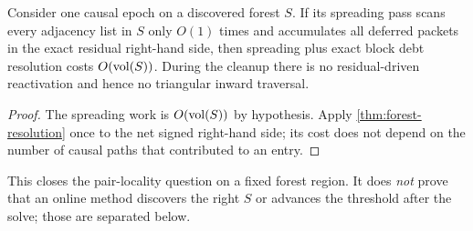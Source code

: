 \begin{corollary}
\label{cor:forest-pair-locality}
Consider one causal epoch on a discovered forest $S$.  If its spreading pass
scans every adjacency list in $S$ only $O(1)$ times and accumulates all
deferred packets in the exact residual right-hand side, then spreading plus
exact block debt resolution costs $O(\operatorname{vol}(S))$.  During the cleanup there is
no residual-driven reactivation and hence no triangular inward traversal.
\end{corollary}

\begin{proof}
The spreading work is $O(\operatorname{vol}(S))$ by hypothesis.  Apply
\cref{thm:forest-resolution} once to the net signed right-hand side; its cost
does not depend on the number of causal paths that contributed to an entry.
\end{proof}

This closes the pair-locality question on a fixed forest region.  It does
\emph{not} prove that an online method discovers the right $S$ or advances the
threshold after the solve; those are separated below.
